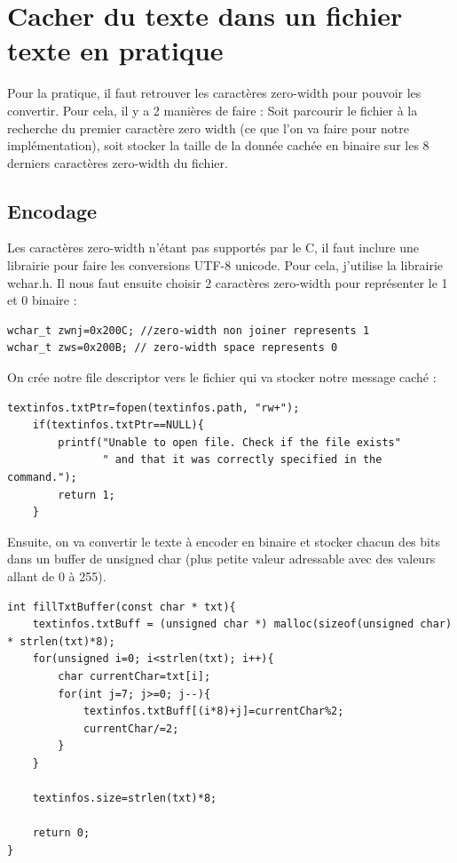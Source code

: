 \newpage
\section{Cacher du texte dans un fichier texte en pratique}
Pour la pratique, il faut retrouver les caractères zero-width pour pouvoir les convertir. Pour cela, il y a 2 manières de faire : Soit parcourir le fichier à la recherche du premier caractère zero width (ce que l'on va faire pour notre implémentation), soit stocker la taille de la donnée cachée en binaire sur les 8 derniers caractères zero-width du fichier.

\subsection{Encodage}
Les caractères zero-width n'étant pas supportés par le C, il faut inclure une librairie pour faire les conversions UTF-8 unicode. Pour cela, j'utilise la librairie wchar.h.
\newline
Il nous faut ensuite choisir 2 caractères zero-width pour représenter le 1 et 0 binaire :
\newline
\begin{lstlisting}
wchar_t zwnj=0x200C; //zero-width non joiner represents 1
wchar_t zws=0x200B; // zero-width space represents 0
\end{lstlisting}
On crée notre file descriptor vers le fichier qui va stocker notre message caché :
\newline
\begin{lstlisting}
textinfos.txtPtr=fopen(textinfos.path, "rw+");
    if(textinfos.txtPtr==NULL){
        printf("Unable to open file. Check if the file exists"
               " and that it was correctly specified in the command.");
        return 1;
    }
\end{lstlisting}
Ensuite, on va convertir le texte à encoder en binaire et stocker chacun des bits dans un buffer de unsigned char (plus petite valeur adressable avec des valeurs allant de 0 à 255).
\newline
\begin{lstlisting}
int fillTxtBuffer(const char * txt){
    textinfos.txtBuff = (unsigned char *) malloc(sizeof(unsigned char) * strlen(txt)*8);
    for(unsigned i=0; i<strlen(txt); i++){
        char currentChar=txt[i];
        for(int j=7; j>=0; j--){
            textinfos.txtBuff[(i*8)+j]=currentChar%2;
            currentChar/=2;
        }
    }

    textinfos.size=strlen(txt)*8;

    return 0;
}
\end{lstlisting}
